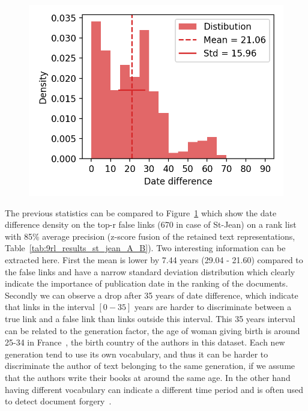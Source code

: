 \begin{figure}
  \label{fig:dates_differences_r_false}
  \includegraphics[width=\linewidth]{img/dates_differences_r_false.png}
\end{figure}

The previous statistics can be compared to Figure~\ref{fig:dates_differences_r_false} which show the date difference density on the top-r false links (670 in case of St-Jean) on a rank list with 85\% average precision (z-score fusion of the retained text representations, Table~\ref{tab:9rl_results_st_jean_A_B}).
Two interesting information can be extracted here.
First the mean is lower by 7.44 years (29.04 - 21.60) compared to the false links and have a narrow standard deviation distribution which clearly indicate the importance of publication date in the ranking of the documents.
Secondly we can observe a drop after 35 years of date difference, which indicate that links in the interval $\left[0-35\right]$ years are harder to discriminate between a true link and a false link than links outside this interval.
This 35 years interval can be related to the generation factor, the age of woman giving birth is around 25-34 in France~\cite{generations}, the birth country of the authors in this dataset.
Each new generation tend to use its own vocabulary, and thus it can be harder to discriminate the author of text belonging to the same generation, if we assume that the authors write their books at around the same age.
In the other hand having different vocabulary can indicate a different time period and is often used to detect document forgery~\cite{savoy_stylo}.

